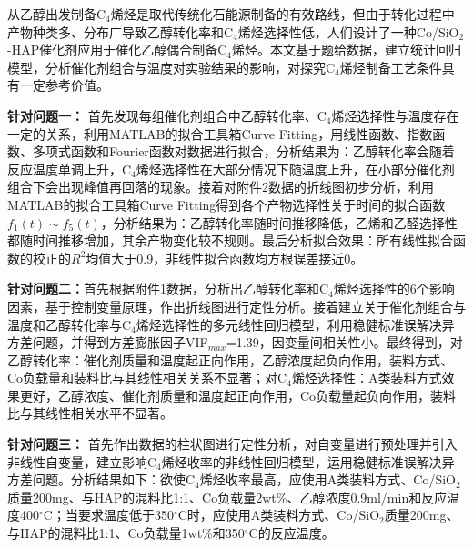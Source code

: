 \documentclass[a4paper,10.5pt]{ctexart}
\begin{document}
\par %
从乙醇出发制备C$_4$烯烃是取代传统化石能源制备的有效路线，但由于转化过程中产物种类多、分布广导致乙醇转化率和C$_4$烯烃选择性低，人们设计了一种Co/SiO$_2$-HAP催化剂应用于催化乙醇偶合制备C$_4$烯烃。本文基于题给数据，建立统计回归模型，分析催化剂组合与温度对实验结果的影响，对探究C$_4$烯烃制备工艺条件具有一定参考价值。
\par \textbf{针对问题一：}%
首先发现每组催化剂组合中乙醇转化率、C$_4$烯烃选择性与温度存在一定的关系，利用MATLAB的拟合工具箱Curve Fitting，用线性函数、指数函数、多项式函数和Fourier函数对数据进行拟合，分析结果为：乙醇转化率会随着反应温度单调上升，C$_4$烯烃选择性在大部分情况下随温度上升，在小部分催化剂组合下会出现峰值再回落的现象。接着对附件2数据的折线图初步分析，利用MATLAB的拟合工具箱Curve Fitting得到各个产物选择性关于时间的拟合函数$f_1(t)\sim f_5(t)$，分析结果为：乙醇转化率随时间推移降低，乙烯和乙醛选择性都随时间推移增加，其余产物变化较不规则。最后分析拟合效果：所有线性拟合函数的校正的$R^2$均值大于0.9，非线性拟合函数均方根误差接近0。
\par \textbf{针对问题二：}首先根据附件1数据，分析出乙醇转化率和C$_4$烯烃选择性的6个影响因素，基于控制变量原理，作出折线图进行定性分析。接着建立关于催化剂组合与温度和乙醇转化率与C$_4$烯烃选择性的多元线性回归模型，利用稳健标准误解决异方差问题，并得到方差膨胀因子VIF$_{max}$=1.39，因变量间相关性小。最终得到，对乙醇转化率：催化剂质量和温度起正向作用，乙醇浓度起负向作用，装料方式、Co负载量和装料比与其线性相关关系不显著；对C$_4$烯烃选择性：A类装料方式效果更好，乙醇浓度、催化剂质量和温度起正向作用，Co负载量起负向作用，装料比与其线性相关水平不显著。


\par \textbf{针对问题三：}
首先作出数据的柱状图进行定性分析，对自变量进行预处理并引入非线性自变量，建立影响C$_4$烯烃收率的非线性回归模型，运用稳健标准误解决异方差问题。分析结果如下：欲使C$_4$烯烃收率最高，应使用A类装料方式、Co/SiO$_2$质量200mg、与HAP的混料比1:1、Co负载量2wt$\%$、乙醇浓度0.9ml/min和反应温度400$^{\circ}$C；当要求温度低于350$^{\circ}$C时，应使用A类装料方式、Co/SiO$_2$质量200mg、与HAP的混料比1:1、Co负载量1wt$\%$和350$^{\circ}$C的反应温度。
\end{document}
